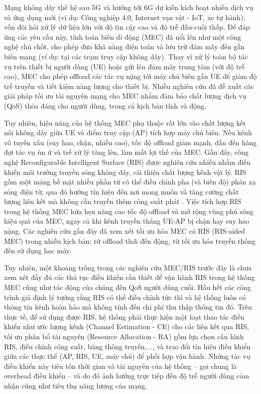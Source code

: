Mạng không dây thế hệ sau 5G và hướng tới 6G dự kiến kích hoạt nhiều dịch vụ và ứng dụng mới (ví dụ: Công nghiệp 4.0, Internet vạn vật - IoT, xe tự hành), vốn đòi hỏi xử lý dữ liệu lớn với độ tin cậy cao và độ trễ đầu-cuối thấp. Để đáp ứng các yêu cầu này, tính toán biên di động (MEC) đã nổi lên như một công nghệ chủ chốt, cho phép đưa khả năng điện toán và lưu trữ đám mây đến gần biên mạng (ví dụ: tại các trạm truy cập không dây). Thay vì xử lý toàn bộ tác vụ trên thiết bị người dùng (UE) hoặc gửi lên đám mây trung tâm (với độ trễ cao), MEC cho phép offload các tác vụ nặng tới máy chủ biên gần UE để giảm độ trễ truyền và tiết kiệm năng lượng cho thiết bị. Nhiều nghiên cứu đã đề xuất các giải pháp tối ưu tài nguyên mạng cho MEC nhằm đảm bảo chất lượng dịch vụ (QoS) thỏa đáng cho người dùng, trong cả kịch bản tĩnh và động. 


Tuy nhiên, hiệu năng của hệ thống MEC phụ thuộc rất lớn vào chất lượng kết nối không dây giữa UE và điểm truy cập (AP) tích hợp máy chủ biên. Nếu kênh vô tuyến xấu (suy hao, chặn, nhiễu cao), tốc độ offload giảm mạnh, dẫn đến hàng đợi tác vụ ùn ứ và trễ xử lý tăng lên, làm mất lợi thế của MEC. Gần đây, công nghệ Reconfigurable Intelligent Surface (RIS) được nghiên cứu nhiều nhằm điều khiển môi trường truyền sóng không dây, cải thiện chất lượng kênh vật lý. RIS gồm một mảng bề mặt nhiều phần tử có thể điều chỉnh pha (và biên độ) phản xạ sóng điện từ, qua đó hướng tín hiệu đến nơi mong muốn và tăng cường chất lượng liên kết mà không cần truyền thêm công suất phát
. Việc tích hợp RIS trong hệ thống MEC hứa hẹn nâng cao tốc độ offload và mở rộng vùng phủ sóng hiệu quả của MEC, ngay cả khi kênh truyền thẳng UE-AP bị chặn hay suy hao nặng. Các nghiên cứu gần đây đã xem xét tối ưu hóa MEC có RIS (RIS-aided MEC) trong nhiều kịch bản: từ offload tĩnh đến động, từ tối ưu hóa truyền thống đến sử dụng học máy.



Tuy nhiên, một khoảng trống trong các nghiên cứu MEC/RIS trước đây là chưa xem xét đầy đủ các thủ tục điều khiển cần thiết để vận hành RIS trong hệ thống MEC cũng như tác động của chúng đến QoS người dùng cuối. Hầu hết các công trình giả định lý tưởng rằng RIS có thể điều chỉnh tức thì và hệ thống luôn có thông tin kênh hoàn hảo mà không tính đến chi phí thu thập thông tin đó. Trên thực tế, để sử dụng được RIS, hệ thống phải thực hiện một loạt thao tác điều khiển như ước lượng kênh (Channel Estimation - CE) cho các liên kết qua RIS, tối ưu phân bổ tài nguyên (Resource Allocation - RA) gồm lựa chọn cấu hình RIS, điều chỉnh công suất, băng thông truyền,..., và trao đổi tín hiệu điều khiển giữa các thực thể (AP, RIS, UE, máy chủ) để phối hợp vận hành. Những tác vụ điều khiển này tiêu tốn thời gian và tài nguyên của hệ thống – gọi chung là overhead điều khiển – và do đó ảnh hưởng trực tiếp đến độ trễ người dùng cảm nhận cũng như tiêu thụ năng lượng của mạng.